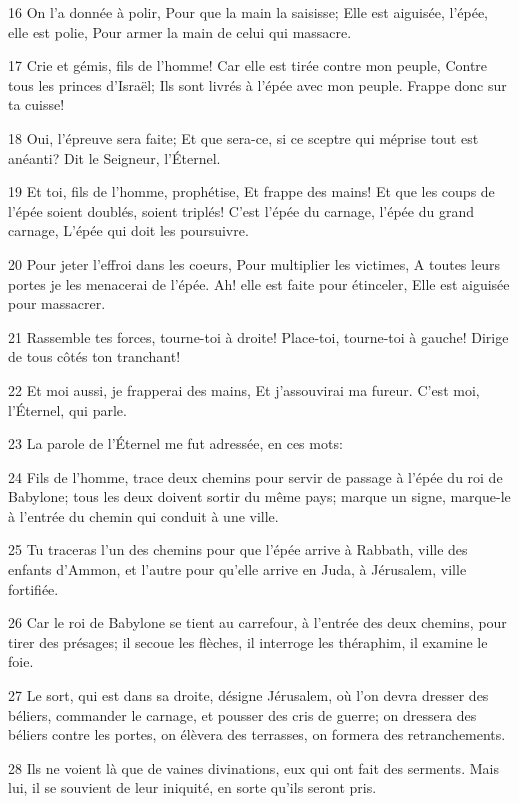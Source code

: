 \par 16 On l'a donnée à polir, Pour que la main la saisisse; Elle est aiguisée, l'épée, elle est polie, Pour armer la main de celui qui massacre.
\par 17 Crie et gémis, fils de l'homme! Car elle est tirée contre mon peuple, Contre tous les princes d'Israël; Ils sont livrés à l'épée avec mon peuple. Frappe donc sur ta cuisse!
\par 18 Oui, l'épreuve sera faite; Et que sera-ce, si ce sceptre qui méprise tout est anéanti? Dit le Seigneur, l'Éternel.
\par 19 Et toi, fils de l'homme, prophétise, Et frappe des mains! Et que les coups de l'épée soient doublés, soient triplés! C'est l'épée du carnage, l'épée du grand carnage, L'épée qui doit les poursuivre.
\par 20 Pour jeter l'effroi dans les coeurs, Pour multiplier les victimes, A toutes leurs portes je les menacerai de l'épée. Ah! elle est faite pour étinceler, Elle est aiguisée pour massacrer.
\par 21 Rassemble tes forces, tourne-toi à droite! Place-toi, tourne-toi à gauche! Dirige de tous côtés ton tranchant!
\par 22 Et moi aussi, je frapperai des mains, Et j'assouvirai ma fureur. C'est moi, l'Éternel, qui parle.
\par 23 La parole de l'Éternel me fut adressée, en ces mots:
\par 24 Fils de l'homme, trace deux chemins pour servir de passage à l'épée du roi de Babylone; tous les deux doivent sortir du même pays; marque un signe, marque-le à l'entrée du chemin qui conduit à une ville.
\par 25 Tu traceras l'un des chemins pour que l'épée arrive à Rabbath, ville des enfants d'Ammon, et l'autre pour qu'elle arrive en Juda, à Jérusalem, ville fortifiée.
\par 26 Car le roi de Babylone se tient au carrefour, à l'entrée des deux chemins, pour tirer des présages; il secoue les flèches, il interroge les théraphim, il examine le foie.
\par 27 Le sort, qui est dans sa droite, désigne Jérusalem, où l'on devra dresser des béliers, commander le carnage, et pousser des cris de guerre; on dressera des béliers contre les portes, on élèvera des terrasses, on formera des retranchements.
\par 28 Ils ne voient là que de vaines divinations, eux qui ont fait des serments. Mais lui, il se souvient de leur iniquité, en sorte qu'ils seront pris.

